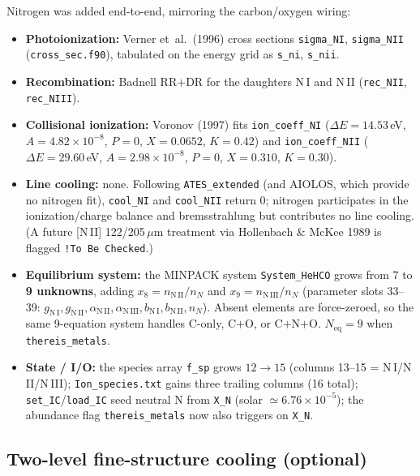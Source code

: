 \documentclass[english,a4paper]{kiseon_memo}
\begin{document}
Nitrogen was added end-to-end, mirroring the carbon/oxygen wiring:
\begin{itemize}
  \item \textbf{Photoionization:} Verner et~al.~(1996) cross sections
    \texttt{sigma\_NI}, \texttt{sigma\_NII} (\texttt{cross\_sec.f90}),
    tabulated on the energy grid as \texttt{s\_ni}, \texttt{s\_nii}.
  \item \textbf{Recombination:} Badnell RR$+$DR for the daughters N\,I
    and N\,II (\texttt{rec\_NII}, \texttt{rec\_NIII}).
  \item \textbf{Collisional ionization:} Voronov (1997) fits
    \texttt{ion\_coeff\_NI} (\(\Delta E=14.53\)\,eV, \(A=4.82\times
    10^{-8}\), \(P=0\), \(X=0.0652\), \(K=0.42\)) and
    \texttt{ion\_coeff\_NII} (\(\Delta E=29.60\)\,eV, \(A=2.98\times
    10^{-8}\), \(P=0\), \(X=0.310\), \(K=0.30\)).
  \item \textbf{Line cooling:} none.  Following \texttt{ATES\_extended}
    (and AIOLOS, which provide no nitrogen fit), \texttt{cool\_NI} and
    \texttt{cool\_NII} return \(0\); nitrogen participates in the
    ionization/charge balance and bremsstrahlung but contributes no
    line cooling.  (A future [N\,II] 122/205\,\(\mu\)m treatment via
    Hollenbach \& McKee 1989 is flagged \texttt{!To Be Checked}.)
  \item \textbf{Equilibrium system:} the MINPACK system
    \texttt{System\_HeHCO} grows from 7 to \textbf{9 unknowns}, adding
    \(x_8 = n_{\mathrm{N\,II}}/n_N\) and \(x_9 = n_{\mathrm{N\,III}}/n_N\)
    (parameter slots 33--39: \(g_{\mathrm{N\,I}}, g_{\mathrm{N\,II}},
    \alpha_{\mathrm{N\,II}}, \alpha_{\mathrm{N\,III}},
    b_{\mathrm{N\,I}}, b_{\mathrm{N\,II}}, n_N\)).  Absent elements are
    force-zeroed, so the same 9-equation system handles C-only, C$+$O,
    or C$+$N$+$O.  \(N_\mathrm{eq}=9\) when \texttt{thereis\_metals}.
  \item \textbf{State / I/O:} the species array \texttt{f\_sp} grows
    \(12\rightarrow15\) (columns 13--15 = N\,I/N\,II/N\,III);
    \texttt{Ion\_species.txt} gains three trailing columns (16 total);
    \texttt{set\_IC}/\texttt{load\_IC} seed neutral N from \texttt{X\_N}
    (solar \(\simeq 6.76\times10^{-5}\)); the abundance flag
    \texttt{thereis\_metals} now also triggers on \texttt{X\_N}.
\end{itemize}

\subsection{Two-level fine-structure cooling (optional)}
\end{document}
